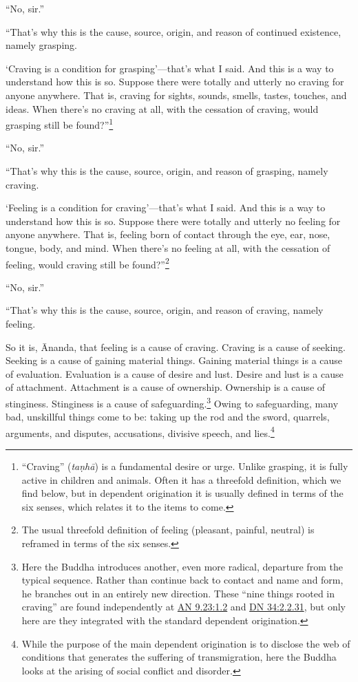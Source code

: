\documentclass[12pt,openany]{book}%
\begin{document}
“No, sir.” 

“That’s why this is the cause, source, origin, and reason of continued existence, namely grasping. 

‘Craving is a condition for grasping’—that’s what I said. And this is a way to understand how this is so. Suppose there were totally and utterly no craving for anyone anywhere. That is, craving for sights, sounds, smells, tastes, touches, and ideas. When there’s no craving at all, with the cessation of craving, would grasping still be found?”\footnote{“Craving” (\textit{\textsanskrit{taṇhā}}) is a fundamental desire or urge. Unlike grasping, it is fully active in children and animals. Often it has a threefold definition, which we find below, but in dependent origination it is usually defined in terms of the six senses, which relates it to the items to come. } 

“No, sir.” 

“That’s why this is the cause, source, origin, and reason of grasping, namely craving. 

‘Feeling is a condition for craving’—that’s what I said. And this is a way to understand how this is so. Suppose there were totally and utterly no feeling for anyone anywhere. That is, feeling born of contact through the eye, ear, nose, tongue, body, and mind. When there’s no feeling at all, with the cessation of feeling, would craving still be found?”\footnote{The usual threefold definition of feeling (pleasant, painful, neutral) is reframed in terms of the six senses. } 

“No, sir.” 

“That’s why this is the cause, source, origin, and reason of craving, namely feeling. 

So it is, Ānanda, that feeling is a cause of craving. Craving is a cause of seeking. Seeking is a cause of gaining material things. Gaining material things is a cause of evaluation. Evaluation is a cause of desire and lust. Desire and lust is a cause of attachment. Attachment is a cause of ownership. Ownership is a cause of stinginess. Stinginess is a cause of safeguarding.\footnote{Here the Buddha introduces another, even more radical, departure from the typical sequence. Rather than continue back to contact and name and form, he branches out in an entirely new direction. These “nine things rooted in craving” are found independently at \href{https://suttacentral.net/an9.23/en/sujato\#1.2}{AN 9.23:1.2} and \href{https://suttacentral.net/dn34/en/sujato\#2.2.31}{DN 34:2.2.31}, but only here are they integrated with the standard dependent origination. } Owing to safeguarding, many bad, unskillful things come to be: taking up the rod and the sword, quarrels, arguments, and disputes, accusations, divisive speech, and lies.\footnote{While the purpose of the main dependent origination is to disclose the web of conditions that generates the suffering of transmigration, here the Buddha looks at the arising of social conflict and disorder. } 
\end{document}
